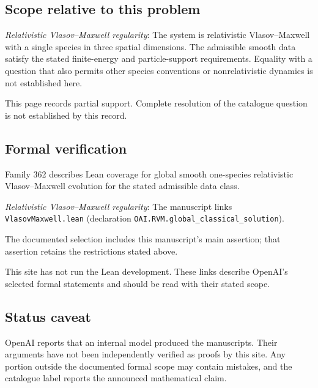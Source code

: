 \documentclass[11pt]{article}
\begin{document}
\subsection{Scope relative to this problem}
\textit{Relativistic Vlasov--Maxwell regularity}: The system is relativistic Vlasov--Maxwell with a single species in three spatial dimensions. The admissible smooth data satisfy the stated finite-energy and particle-support requirements. Equality with a question that also permits other species conventions or nonrelativistic dynamics is not established here.

This page records partial support. Complete resolution of the catalogue question is not established by this record.

\subsection{Formal verification}
Family 362 describes Lean coverage for global smooth one-species relativistic Vlasov--Maxwell evolution for the stated admissible data class.

\textit{Relativistic Vlasov--Maxwell regularity}: The manuscript links \texttt{VlasovMaxwell.lean} (declaration \texttt{OAI.RVM.global\_classical\_solution}).

The documented selection includes this manuscript’s main assertion; that assertion retains the restrictions stated above.

This site has not run the Lean development. These links describe OpenAI’s selected formal statements and should be read with their stated scope.

\subsection{Status caveat}
OpenAI reports that an internal model produced the manuscripts. Their arguments have not been independently verified as proofs by this site. Any portion outside the documented formal scope may contain mistakes, and the catalogue label reports the announced mathematical claim.
\end{document}
